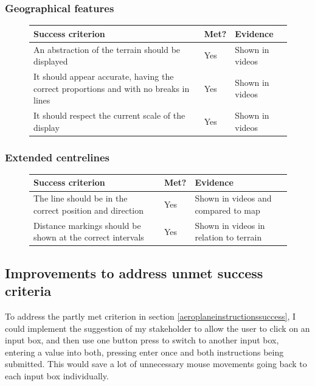 \documentclass{article}
\begin{document}
\subsubsection{Geographical features}
\begin{figure}[H]
\centering
\begin{tabular}{| p{} | p{} | p{} |}
\hline
\textbf{Success criterion} & \textbf{Met?} & \textbf{Evidence} \\
\hline
An abstraction of the terrain should be displayed & Yes & Shown in videos \\
\hline
It should appear accurate, having the correct proportions and with no breaks in lines & Yes & Shown in videos \\
\hline
It should respect the current scale of the display & Yes & Shown in videos \\
\hline
\end{tabular}
\end{figure}

\subsubsection{Extended centrelines}
\begin{figure}[H]
\centering
\begin{tabular}{| p{} | p{} | p{} |}
\hline
\textbf{Success criterion} & \textbf{Met?} & \textbf{Evidence} \\
\hline
The line should be in the correct position and direction & Yes & Shown in videos and compared to map \\
\hline
Distance markings should be shown at the correct intervals & Yes & Shown in videos in relation to terrain \\
\hline
\end{tabular}
\end{figure}


\subsection{Improvements to address unmet success criteria}
To address the partly met criterion in section \ref{aeroplaneinstructionssuccess}, I could implement the suggestion of my stakeholder to allow the user to click on an input box, and then use one button press to switch to another input box, entering a value into both, pressing enter once and both instructions being submitted.
This would save a lot of unnecessary mouse movements going back to each input box individually.
\end{document}
